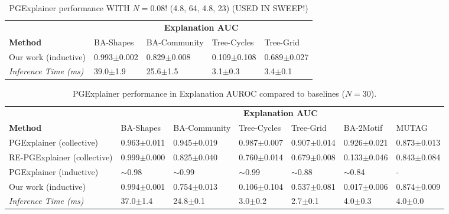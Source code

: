 \begin{table}[ht]
    \centering
    \scriptsize
    \begin{tabularx}{\textwidth}{l*{4}{X}}   %
    \toprule
    \textbf{} & \multicolumn{4}{c}{\textbf{Explanation AUC}} \\
    \cmidrule{2-5}
    \textbf{Method} & BA-Shapes & BA-Community & Tree-Cycles & Tree-Grid \\
    \midrule
    Our work (inductive) & 0.993$\pm$0.002 & 0.829$\pm$0.008 & 0.109$\pm$0.108 & 0.689$\pm$0.027 \\
    \addlinespace
    \midrule
    \midrule
    \textit{Inference Time (ms)} & 39.0$\pm$1.9 & 25.6$\pm$1.5 & 3.1$\pm$0.3 & 3.4$\pm$0.1 \\
    \bottomrule
    \end{tabularx}
    \caption[REMOVE! PGExplainer with $N=0.08$!]{PGExplainer performance WITH $N=0.08$! (4.8, 64, 4.8, 23) (USED IN SWEEP!)}
    \label{tab:pgexplainer_auc}
\end{table}

\begin{table}[ht]
    \centering
    \scriptsize
    \begin{tabularx}{\textwidth}{l*{6}{X}}   %
    \toprule
    \textbf{} & \multicolumn{6}{c}{\textbf{Explanation AUC}} \\
    \cmidrule{2-7}
    \textbf{Method} & BA-Shapes & BA-Community & Tree-Cycles & Tree-Grid & BA-2Motif & MUTAG \\
    \midrule
    PGExplainer (collective) & 0.963$\pm$0.011 & 0.945$\pm$0.019 & 0.987$\pm$0.007 & 0.907$\pm$0.014 & 0.926$\pm$0.021 & 0.873$\pm$0.013 \\
    \midrule
    RE-PGExplainer (collective) & 0.999$\pm$0.000 & 0.825$\pm$0.040 & 0.760$\pm$0.014 & 0.679$\pm$0.008 & 0.133$\pm$0.046 & 0.843$\pm$0.084 \\
    \midrule
    PGExplainer (inductive) & $\sim$0.98 & $\sim$0.99 & $\sim$0.99 & $\sim$0.88 & $\sim$0.84 & - \\
    \midrule
    Our work (inductive) & 0.994$\pm$0.001 & 0.754$\pm$0.013 & 0.106$\pm$0.104 & 0.537$\pm$0.081 & 0.017$\pm$0.006 & 0.874$\pm$0.009 \\
    \addlinespace
    \midrule
    \midrule
    \textit{Inference Time (ms)} & 37.0$\pm$1.4 & 24.8$\pm$0.1 & 3.0$\pm$0.2 & 2.7$\pm$0.1 & 4.0$\pm$0.3 & 4.0$\pm$0.0 \\
    \bottomrule
    \end{tabularx}
    \caption[Inductive performance of our reimplementation]{PGExplainer performance in Explanation AUROC compared to baselines ($N=30$).}
    \label{tab:pgexplainer_auc}
\end{table}

